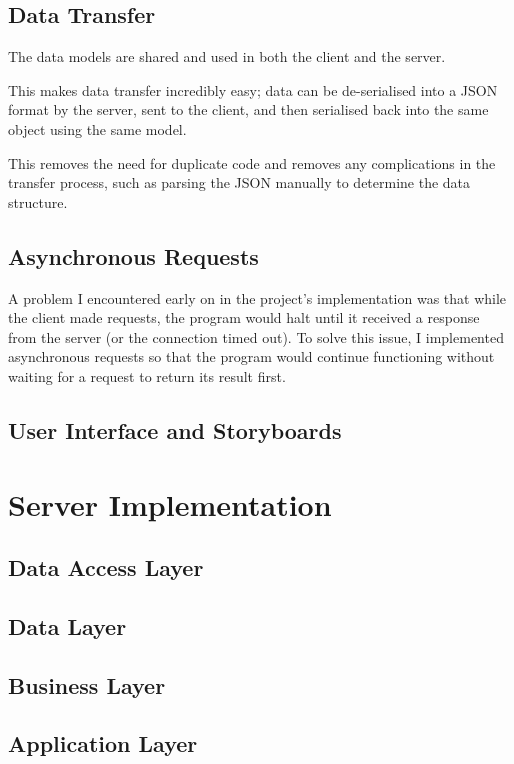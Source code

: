 \subsection{Data Transfer}

The data models are shared and used in both the client and the server. 

This makes data transfer incredibly easy; data can be de-serialised into a JSON format by the server, sent to the client, and then serialised back into the same object using the same model. 

This removes the need for duplicate code and removes any complications in the transfer process, such as parsing the JSON manually to determine the data structure.

\subsection{Asynchronous Requests}

A problem I encountered early on in the project's implementation was that while the client made requests, the program would halt until it received a response from the server (or the connection timed out). To solve this issue, I implemented asynchronous requests so that the program would continue functioning without waiting for a request to return its result first.

\subsection{User Interface and Storyboards}

\section{Server Implementation}
\subsection{Data Access Layer}
\subsection{Data Layer}
\subsection{Business Layer}
\subsection{Application Layer}

